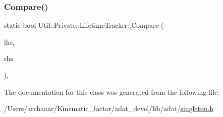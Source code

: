 \subsubsection{\texorpdfstring{Compare()}{Compare()}\hspace{0.1cm}{\footnotesize\ttfamily [2/2]}}
{\footnotesize\ttfamily static bool Util\+::\+Private\+::\+Lifetime\+Tracker\+::\+Compare (\begin{DoxyParamCaption}\item[{const \mbox{\hyperlink{classUtil_1_1Private_1_1LifetimeTracker}{Lifetime\+Tracker}} $\ast$}]{lhs,  }\item[{const \mbox{\hyperlink{classUtil_1_1Private_1_1LifetimeTracker}{Lifetime\+Tracker}} $\ast$}]{rhs }\end{DoxyParamCaption})\hspace{0.3cm}{\ttfamily [inline]}, {\ttfamily [static]}}



The documentation for this class was generated from the following file\+:\begin{DoxyCompactItemize}
\item 
/\+Users/archanar/\+Kinematic\+\_\+factor/adat\+\_\+devel/lib/adat/\mbox{\hyperlink{lib_2adat_2singleton_8h}{singleton.\+h}}\end{DoxyCompactItemize}
